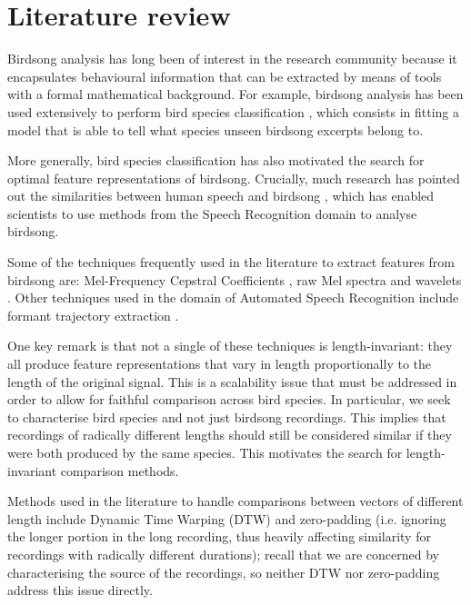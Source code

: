 \documentclass[pdftex,11pt,a4paper]{article}
\theoremstyle{definition}
\theoremstyle{remark}
\begin{document}
\section{Literature review}
\label{section_review}
Birdsong analysis has long been of interest in the research community because it encapsulates behavioural information that can be extracted by means of tools with a formal mathematical background. For example, birdsong analysis has been used extensively to perform bird species classification \cite{Chou2009,Wielgat2012,McIlraith1995,Lee2013,Franzen2003,Silla2013}, which consists in fitting a model that is able to tell what species unseen birdsong excerpts belong to.
\par More generally, bird species classification has also motivated the search for optimal feature representations of birdsong. Crucially, much research has pointed out the similarities between human speech and birdsong \cite{Snowdon2013,McIlraith1995}, which has enabled scientists to use methods from the Speech Recognition domain to analyse birdsong.
\par Some of the techniques frequently used in the literature to extract features from birdsong are: Mel-Frequency Cepstral Coefficients \cite{Silla2013,Wielgat2012,Stowell2014,Lopes2011}, raw Mel spectra \cite{Stowell2014} and wavelets \cite{Chou2009}. Other techniques used in the domain of Automated Speech Recognition include formant trajectory extraction \cite{Prica2010,Welling1998}.
\par One key remark is that not a single of these techniques is length-invariant: they all produce feature representations that vary in length proportionally to the length of the original signal. This is a scalability issue that must be addressed in order to allow for faithful comparison across bird species. In particular, we seek to characterise bird species and not just birdsong recordings. This implies that recordings of radically different lengths should still be considered similar if they were both produced by the same species. This motivates the search for length-invariant comparison methods.
\par Methods used in the literature to handle comparisons between vectors of different length include Dynamic Time Warping (DTW) \cite{Jancovic2013,Muda2010} and zero-padding (i.e. ignoring the longer portion in the long recording, thus heavily affecting similarity for recordings with radically different durations); recall that we are concerned by characterising the source of the recordings, so neither DTW nor zero-padding address this issue directly. 
\end{document}
